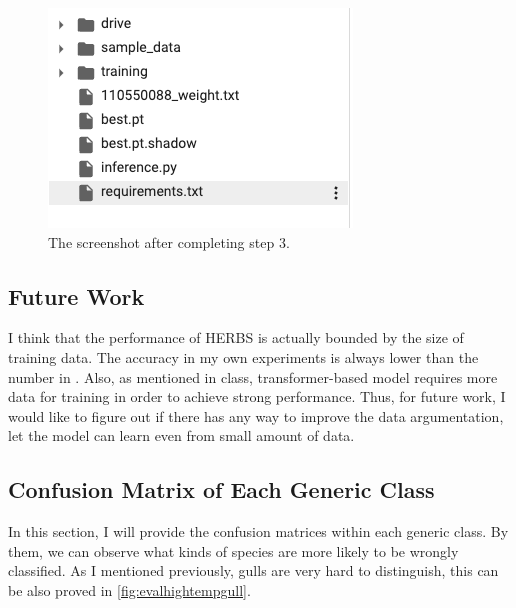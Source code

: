 \documentclass[twocolumn]{extarticle}
\begin{document}
\begin{figure}[H]
\centering
\includegraphics[width=0.95\linewidth]{figure/colabfile}
\caption{The screenshot after completing step 3.}
\label{fig:colabfile}
\end{figure}


\subsection{Future Work}

I think that the performance of HERBS is actually bounded by the size of training data. The accuracy in my own experiments is always lower than the number in \cite{chou2023fine}. Also, as mentioned in class, transformer-based model requires more data for training in order to achieve strong performance. Thus, for future work, I would like to figure out if there has any way to improve the data argumentation, let the model can learn even from small amount of data.


\subsection{Confusion Matrix of Each Generic Class\label{sec:confusion}}

In this section, I will provide the confusion matrices within each generic class. By them, we can observe what kinds of species are more likely to be wrongly classified. As I mentioned previously, gulls are very hard to distinguish, this can be also proved in \autoref{fig:evalhightempgull}.
\end{document}

